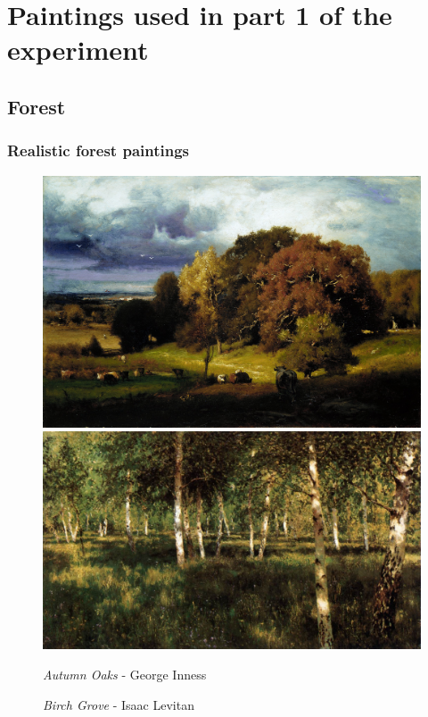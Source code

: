 \documentclass[a4paper]{article}
\begin{document}
\newpage

\appendix
\section{Paintings used in part 1 of the experiment} \label{sec:paintings}

\subsection{Forest}

\subsubsection{Realistic forest paintings}
\begin {figure}[h!]
\centering
\begin{minipage}[b]{.49\textwidth}
	\centering
	\includegraphics[width=\textwidth]{ForestPaintings/R1innessautumnoaks.jpg}
\end{minipage}
\hfill
\begin{minipage}[b]{.49\textwidth}
	\centering
	\includegraphics[width=\textwidth]{ForestPaintings/R2levitanbirchgrove.jpg}
\end{minipage}
\begin{minipage}[b]{.49\textwidth}
    \caption{\emph{Autumn Oaks} - George Inness}
\end{minipage}
\begin{minipage}[b]{.49\textwidth}
    \caption{\emph{Birch Grove} - Isaac Levitan}
\end{minipage}
\end{figure}
\end{document}
